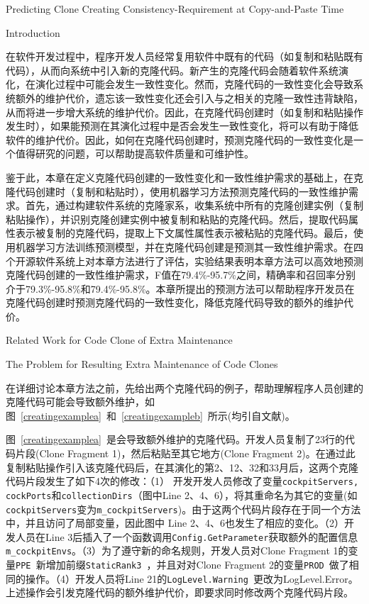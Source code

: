 
{Predicting Clone Creating Consistency-Requirement at Copy-and-Paste Time}

{Introduction}

在软件开发过程中，程序开发人员经常复用软件中既有的代码（如复制和粘贴既有代码），从而向系统中引入新的克隆代码。新产生的克隆代码会随着软件系统演化，在演化过程中可能会发生一致性变化。然而，克隆代码的一致性变化会导致系统额外的维护代价，遗忘该一致性变化还会引入与之相关的克隆一致性违背缺陷，从而将进一步增大系统的维护代价。因此，在克隆代码创建时（如复制和粘贴操作发生时），如果能预测在其演化过程中是否会发生一致性变化，将可以有助于降低软件的维护代价。因此，如何在克隆代码创建时，预测克隆代码的一致性变化是一个值得研究的问题，可以帮助提高软件质量和可维护性。

鉴于此，本章在定义克隆代码创建的一致性变化和一致性维护需求的基础上，在克隆代码创建时（复制和粘贴时），使用机器学习方法预测克隆代码的一致性维护需求。首先，通过构建软件系统的克隆家系，收集系统中所有的克隆创建实例（复制粘贴操作），并识别克隆创建实例中被复制和粘贴的克隆代码。然后，提取代码属性表示被复制的克隆代码，提取上下文属性属性表示被粘贴的克隆代码。最后，使用机器学习方法训练预测模型，并在克隆代码创建是预测其一致性维护需求。在四个开源软件系统上对本章方法进行了评估，实验结果表明本章方法可以高效地预测克隆代码创建的一致性维护需求，F值在79.4\%-95.7\%之间，精确率和召回率分别介于79.3\%-95.8\%和79.4\%-95.8\%。本章所提出的预测方法可以帮助程序开发员在克隆代码创建时预测克隆代码的一致性变化，降低克隆代码导致的额外的维护代价。

{Related Work for Code Clone of Extra Maintenance}

{The Problem for Resulting Extra Maintenance of Code Clones}

在详细讨论本章方法之前，先给出两个克隆代码的例子，帮助理解程序人员创建的克隆代码可能会导致额外维护，如图~\ref{creatingexamplea}~和~\ref{creatingexampleb}~所示(均引自文献\cite{wang2014predicting})。

图~\ref{creatingexamplea}~是会导致额外维护的克隆代码。开发人员复制了23行的代码片段(Clone Fragment 1)，然后粘贴至其它地方(Clone Fragment 2)。在通过此复制粘贴操作引入该克隆代码后，在其演化的第2、12、32和33月后，这两个克隆代码片段发生了如下4次的修改：（1） 开发开发人员修改了变量{\tt cockpitServers, cockPorts\/}和{\tt collectionDirs}（图中Line 2、4、6），将其重命名为其它的变量(如{\tt cockpitServers\/}变为{\tt m\_cockpitServers\/})。由于这两个代码片段存在于同一个方法中，并且访问了局部变量，因此图中 Line 2、4、6也发生了相应的变化。（2）开发人员在Line 3后插入了一个函数调用{\tt Config.GetParameter\/}获取额外的配置信息{\tt m\_cockpitEnvs\/}。（3）为了遵守新的命名规则，开发人员对Clone Fragment 1的变量{\tt PPE \/}新增加前缀{\tt StaticRank3 \/}，并且对对Clone Fragment 2的变量{\tt PROD \/}做了相同的操作。（4）开发人员将Line 21的{\tt LogLevel.Warning \/}更改为{LogLevel.Error\/}。上述操作会引发克隆代码的额外维护代价，即要求同时修改两个克隆代码片段。

